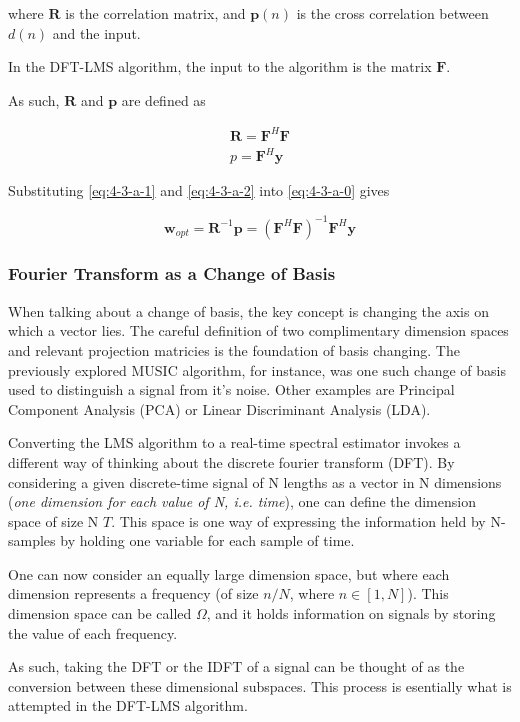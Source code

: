 \documentclass[main.tex]{subfiles}
\begin{document}
where $\textbf{R}$ is the correlation matrix, and $\textbf{p}(n)$ is the cross correlation between $d(n)$ and the input.

In the DFT-LMS algorithm, the input to the algorithm is the matrix $\textbf{F}$.

As such, $\textbf{R}$ and $\textbf{p}$ are defined as 

\begin{align}
\textbf{R} = \textbf{F}^H\textbf{F} \label{eq:4-3-a-1}\\
p = \textbf{F}^H\textbf{y}\label{eq:4-3-a-2}
\end{align}

Substituting \ref{eq:4-3-a-1} and \ref{eq:4-3-a-2} into \ref{eq:4-3-a-0} gives 

\begin{equation}
\textbf{w}_{opt} = \textbf{R}^{-1}\textbf{p} = (\textbf{F}^H\textbf{F})^{-1}\textbf{F}^H\textbf{y}
\end{equation}

\subsubsection{Fourier Transform as a Change of Basis}

When talking about a change of basis, the key concept is changing the axis on which a vector lies. The careful definition of two complimentary dimension spaces and relevant projection matricies is the foundation of basis changing. The previously explored MUSIC algorithm, for instance, was one such change of basis used to distinguish a signal from it's noise. Other examples are Principal Component Analysis (PCA) or Linear Discriminant Analysis (LDA). 

Converting the LMS algorithm to a real-time spectral estimator invokes a different way of thinking about the discrete fourier transform (DFT). By considering a given discrete-time signal of N lengths as a vector in N dimensions (\textit{one dimension for each value of N, i.e. time}), one can define the dimension space of size N $T$. This space is one way of expressing the information held by N-samples by holding one variable for each sample of time.

One can now consider an equally large dimension space, but where each dimension represents a frequency (of size $n/N$, where $n \in [1,N]$). This dimension space can be called $\Omega$, and it holds information on signals by storing the value of each frequency. 

As such, taking the DFT or the IDFT of a signal can be thought of as the conversion between these dimensional subspaces. This process is esentially what is attempted in the DFT-LMS algorithm.
\end{document}
